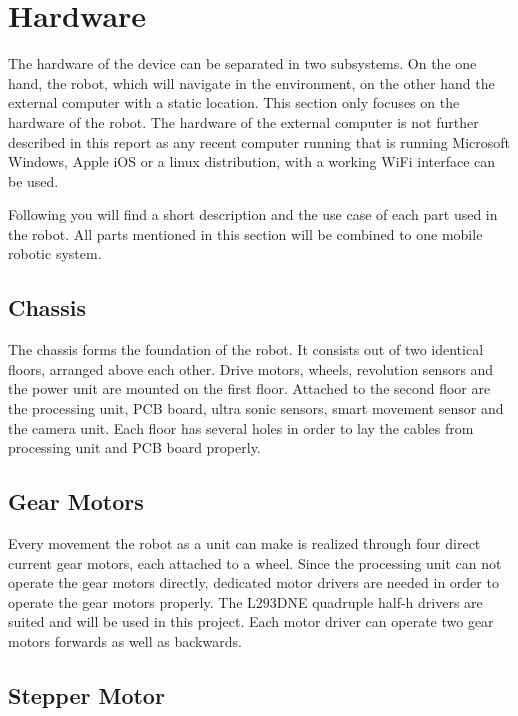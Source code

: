 \newpage

\section{Hardware}\label{sec:hardware}

The hardware of the device can be separated in two subsystems. On the one hand, the robot, which will navigate in the environment, on the other hand the external computer with a static location. This section only focuses on the hardware of the robot. The hardware of the external computer is not further described in this report as any recent computer running that is running Microsoft Windows, Apple iOS or a linux distribution, with a working WiFi interface can be used.

Following you will find a short description and the use case of each part used in the robot. All parts mentioned in this section will be combined to one mobile robotic system.

\subsection{Chassis}\label{subsec:chassis}

The chassis forms the foundation of the robot. It consists out of two identical floors, arranged above each other. Drive motors, wheels, revolution sensors and the power unit are mounted on the first floor. Attached to the second floor are the processing unit, PCB board, ultra sonic sensors, smart movement sensor and the camera unit. Each floor has several holes in order to lay the cables from processing unit and PCB board properly.

\subsection{Gear Motors}\label{subsec:gear_motors}

Every movement the robot as a unit can make is realized through four direct current gear motors, each attached to a wheel. Since the processing unit can not operate the gear motors directly, dedicated motor drivers are needed in order to operate the gear motors properly. The L293DNE quadruple half-h drivers \cite{l293dne} are suited and will be used in this project. Each motor driver can operate two gear motors forwards as well as backwards. 

\subsection{Stepper Motor}\label{subsec:stepper_motor}

